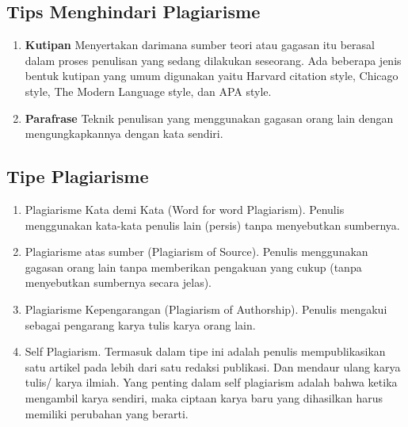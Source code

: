 \documentclass{article}
\begin{document}
\subsection{Tips Menghindari Plagiarisme}
\begin{enumerate}
    \item \textbf{Kutipan} 
     \newline Menyertakan darimana sumber teori atau gagasan itu berasal dalam proses penulisan yang sedang dilakukan seseorang. Ada beberapa jenis bentuk kutipan yang umum digunakan yaitu Harvard citation style, Chicago style, The Modern Language style, dan APA style.
     \item \textbf{Parafrase}
     \newline Teknik penulisan yang menggunakan gagasan orang lain dengan mengungkapkannya dengan
kata sendiri.
\end{enumerate}

\subsection{Tipe Plagiarisme}
\begin{enumerate}
    \item Plagiarisme Kata demi Kata (Word for word Plagiarism). Penulis menggunakan kata-kata penulis lain (persis) tanpa menyebutkan sumbernya.
    \item Plagiarisme atas sumber (Plagiarism of Source). Penulis menggunakan gagasan orang lain tanpa memberikan pengakuan yang cukup (tanpa menyebutkan sumbernya secara jelas).
    \item Plagiarisme Kepengarangan (Plagiarism of Authorship). Penulis mengakui sebagai pengarang karya tulis karya orang lain.
    \item Self Plagiarism. Termasuk dalam tipe ini adalah penulis mempublikasikan satu artikel pada lebih dari satu redaksi publikasi. Dan mendaur ulang karya tulis/ karya ilmiah. Yang penting dalam self plagiarism adalah bahwa ketika mengambil karya sendiri, maka ciptaan karya baru yang dihasilkan harus memiliki perubahan yang berarti.
\end{enumerate}
\end{document}
